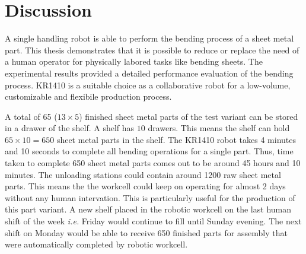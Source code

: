 \chapter{Discussion}
\label{chap:discussion}
A single handling robot is able to perform the bending process of a sheet metal part. This thesis demonstrates that it is possible to reduce or replace the need of a human operator for physically labored tasks like bending sheets. The experimental results provided a detailed performance evaluation of the bending process. KR1410 is a suitable choice as a collaborative robot for a low-volume, customizable and flexibile production process.

A total of 65 ($13 \times 5$) finished sheet metal parts of the test variant can be stored in a drawer of the shelf. A shelf has $10$ drawers. This means the shelf can hold $65 \times 10 = 650$ sheet metal parts in the shelf. The KR1410 robot takes 4 minutes and 10 seconds to complete all bending operations for a single part. Thus, time taken to complete 650 sheet metal parts comes out to be around 45 hours and 10 minutes.
The unloading stations could contain around 1200 raw sheet metal parts. This means the the workcell could keep on operating for almost 2 days without any human intervation. This is particularly useful for the production of this part variant. A new shelf placed in the robotic workcell on the last human shift of the week \textit{i.e.} Friday would continue to fill until Sunday evening. The next shift on Monday would be able to receive 650 finished parts for assembly that were automatically completed by robotic workcell.

